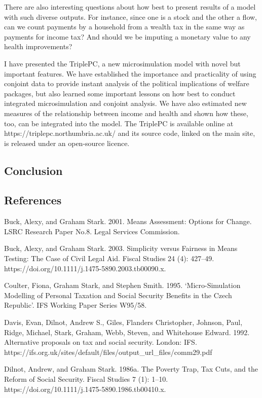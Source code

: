 \documentclass[
  letterpaper,
  DIV=11,
  numbers=noendperiod]{scrartcl}
\begin{document}
There are also interesting questions about how best to present results
of a model with such diverse outputs. For instance, since one is a stock
and the other a flow, can we count payments by a household from a wealth
tax in the same way as payments for income tax? And should we be
imputing a monetary value to any health improvements?

I have presented the TriplePC, a new microsimulation model with novel
but important features. We have established the importance and
practicality of using conjoint data to provide instant analysis of the
political implications of welfare packages, but also learned some
important lessons on how best to conduct integrated microsimulation and
conjoint analysis. We have also estimated new measures of the
relationship between income and health and shown how these, too, can be
integrated into the model. The TriplePC is available online at
https://triplepc.northumbria.ac.uk/ and its source code, linked on the
main site, is released under an open-source licence.

\subsection{Conclusion}\label{conclusion}

\subsection{References}\label{references}

Buck, Alexy, and Graham Stark. 2001. Means Assessment: Options for
Change. LSRC Research Paper No.8. Legal Services Commission.

Buck, Alexy, and Graham Stark. 2003. Simplicity versus Fairness in Means
Testing: The Case of Civil Legal Aid. Fiscal Studies 24 (4): 427--49.
https://doi.org/10.1111/j.1475-5890.2003.tb00090.x.

Coulter, Fiona, Graham Stark, and Stephen Smith. 1995. `Micro-Simulation
Modelling of Personal Taxation and Social Security Benefits in the Czech
Republic'. IFS Working Paper Series W95/58.

Davis, Evan, Dilnot, Andrew S., Giles, Flanders Christopher, Johnson,
Paul, Ridge, Michael, Stark, Graham, Webb, Steven, and Whitehouse
Edward. 1992. Alternative proposals on tax and social security. London:
IFS.
https://ifs.org.uk/sites/default/files/output\_url\_files/comm29.pdf

Dilnot, Andrew, and Graham Stark. 1986a. The Poverty Trap, Tax Cuts, and
the Reform of Social Security. Fiscal Studies 7 (1): 1--10.
https://doi.org/10.1111/j.1475-5890.1986.tb00410.x.
\end{document}

